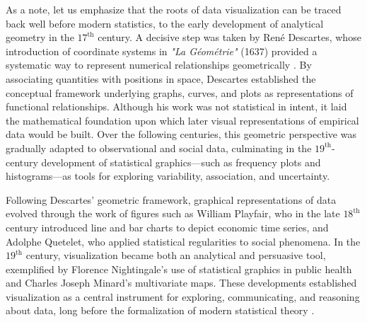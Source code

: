 \medskip

As a note, let us emphasize that the roots of data visualization can be traced back well before modern statistics, to the early development of analytical geometry in the $17^{\text{th}}$ century. A decisive step was taken by René Descartes, whose introduction of coordinate systems in \textit{"La Géométrie"} (1637) provided a systematic way to represent numerical relationships geometrically \cite{descartes_1637_geometry}. By associating quantities with positions in space, Descartes established the conceptual framework underlying graphs, curves, and plots as representations of functional relationships. Although his work was not statistical in intent, it laid the mathematical foundation upon which later visual representations of empirical data would be built. Over the following centuries, this geometric perspective was gradually adapted to observational and social data, culminating in the $19^{\text{th}}$-century development of statistical graphics—such as frequency plots and histograms—as tools for exploring variability, association, and uncertainty.

\medskip

Following Descartes’ geometric framework, graphical representations of data evolved through the work of figures such as William Playfair, who in the late $18^{\text{th}}$ century introduced line and bar charts to depict economic time series, and Adolphe Quetelet, who applied statistical regularities to social phenomena. In the $19^{\text{th}}$ century, visualization became both an analytical and persuasive tool, exemplified by Florence Nightingale’s use of statistical graphics in public health and Charles Joseph Minard’s multivariate maps. These developments established visualization as a central instrument for exploring, communicating, and reasoning about data, long before the formalization of modern statistical theory \cite{minard_1862_graphique, playfair_1786_atlas}.

